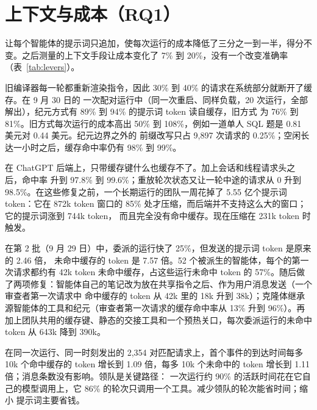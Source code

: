 \section{上下文与成本（RQ1）}
\label{sec:context}

让每个智能体的提示词只追加，使每次运行的成本降低了三分之一到一半，得分不变。之后测量的上下文手段让成本变化了
7\% 到 20\%，没有一个改变准确率（表~\ref{tab:levers}）。

旧编译器每一轮都重新渲染指令，因此 30\% 到 40\% 的请求在系统部分就断开了缓存。在 9 月 30 日的
一次配对运行中（同一次重启、同样负载，20 次运行，全部解出），纪元方式有 89\% 到 94\% 的提示词 token 读自缓存，旧方式
为 76\% 到 81\%。旧方式每次运行的成本高出 50\% 到 108\%，例如一道单人 SQL 题是 0.81 美元对 0.44 美元。纪元边界之外的
前缀改写只占 9,897 次请求的 0.25\%；空闲长达一小时之后，缓存命中率仍有 98\% 到 99\%。

在 ChatGPT 后端上，只带缓存键什么也缓存不了。加上会话和线程请求头之后，命中率
升到 97.8\% 到 99.6\%；重放轮次状态又让一轮中途的请求从 0 升到 98.5\%。在这些修复之前，一个长期运行的团队一周花掉了
5.55 亿个提示词 token：它在 872k token 窗口的 85\% 处才压缩，而后端并不支持这么大的窗口；它的提示词涨到 744k token，
而且完全没有命中缓存。现在压缩在 231k token 时触发。

在第 2 批（9 月 29 日）中，委派的运行快了 25\%，但发送的提示词 token 是原来的 2.46 倍，
未命中缓存的 token 是 7.57 倍。52 个被派生的智能体，每个的第一次请求都约有 42k token 未命中缓存，占这些运行未命中
token 的 57\%。随后做了两项修复：智能体自己的笔记改为放在共享指令之后、作为用户消息发送（一个审查者第一次请求中
命中缓存的 token 从 42k 里的 18k 升到 38k）；克隆体继承源智能体的工具和纪元（审查者第一次请求的缓存命中率从 13\% 升到
96\%）。再加上团队共用的缓存键、静态的交接工具和一个预热关口，每次委派运行的未命中 token 从 643k 降到 390k。

在同一次运行、同一时刻发出的 2,354 对匹配请求上，首个事件的到达时间每多
10k 个命中缓存的 token 增长到 1.09 倍，每多 10k 个未命中的 token 增长到 1.11 倍；消息条数没有影响。领队是关键路径：
一次运行约 90\% 的活跃时间花在它自己的模型调用上，它 86\% 的轮次只调用一个工具。减少领队的轮次能省时间；缩小
提示词主要省钱。

